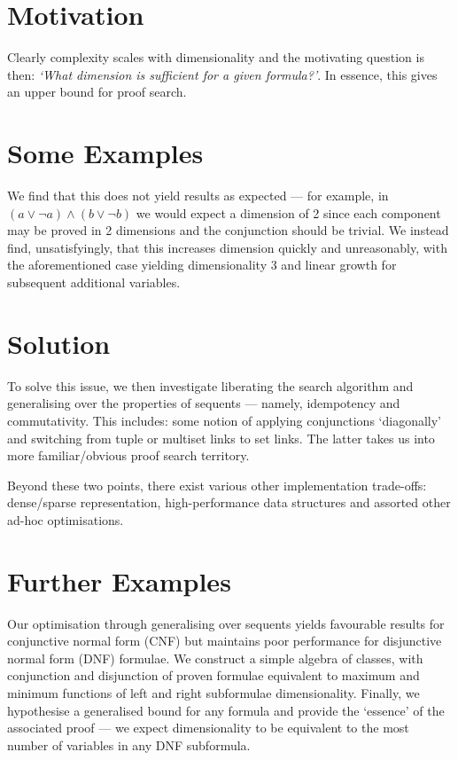     \section*{Motivation}
        Clearly complexity scales with dimensionality and the motivating question is then: \textit{`What dimension is sufficient for a given formula?'}.
        In essence, this gives an upper bound for proof search.

    \section*{Some Examples}
        We find that this does not yield results as expected --- for example, in $(a \vee \neg a) \wedge (b \vee \neg b)$ we would expect a dimension of 2 since each component may be proved in 2 dimensions and the conjunction should be trivial.
        We instead find, unsatisfyingly, that this increases dimension quickly and unreasonably, with the aforementioned case yielding dimensionality 3 and linear growth for subsequent additional variables.

    \section*{Solution}
        To solve this issue, we then investigate liberating the search algorithm and generalising over the properties of sequents --- namely, idempotency and commutativity.
        This includes: some notion of applying conjunctions `diagonally' and switching from tuple or multiset links to set links.
        The latter takes us into more familiar/obvious proof search territory.
        
        Beyond these two points, there exist various other implementation trade-offs: dense/sparse representation, high-performance data structures and assorted other ad-hoc optimisations.

    \section*{Further Examples}
        Our optimisation through generalising over sequents yields favourable results for conjunctive normal form (CNF) but maintains poor performance for disjunctive normal form (DNF) formulae.
        We construct a simple algebra of classes, with conjunction and disjunction of proven formulae equivalent to maximum and minimum functions of left and right subformulae dimensionality.
        Finally, we hypothesise a generalised bound for any formula and provide the `essence' of the associated proof --- we expect dimensionality to be equivalent to the most number of variables in any DNF subformula.

